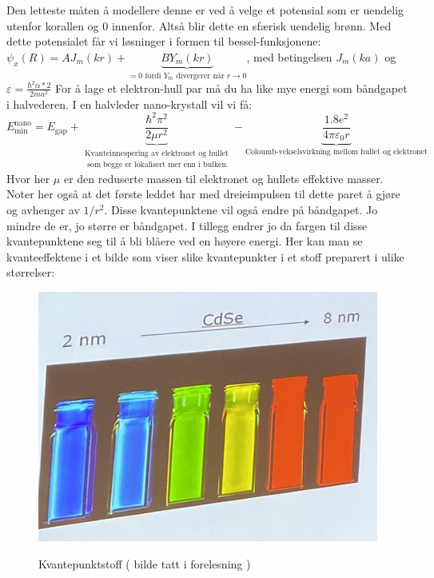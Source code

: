 \documentclass{article}
\begin{document}
Den letteste måten å modellere denne er ved å velge et potensial som er uendelig utenfor korallen og 0 innenfor. Altså blir dette en sfærisk uendelig brønn. Med dette potensialet får vi løsninger i formen til bessel-funksjonene: $\psi_x(R) = AJ_m(kr) + \underbrace{BY_m(kr)}_{=0 \text{ fordi $Y_m$ divergerer når $r\rightarrow 0$}}$, med betingelsen $J_m(ka)$ og $\varepsilon = \frac{\hbar^2 \alpha*2}{2ma^2}$   
For å lage et elektron-hull par må du ha like mye energi som båndgapet i halvederen. I en halvleder nano-krystall vil vi få:
\begin{equation}
  E^{\text{nano}}_{\text{min}} = E_{\text{gap}} + \underbrace{ \frac{\hbar^2 \pi^2}{2 \mu r^2}}_{\substack{\text{Kvanteinnespering av elektronet og hullet} \\ \text{ som begge er lokalisert mer enn i bulken.}}} - \underbrace{\frac{1.8 e^2}{4 \pi \varepsilon_0 r}}_{\text{Coloumb-vekselsvirkning mellom hullet og elektronet}}
\end{equation}
Hvor her $\mu$ er den reduserte massen til elektronet og hullets effektive masser. Noter her også at det første leddet har med dreieimpulsen til dette paret å gjøre og avhenger av $1/r^2$. Disse kvantepunktene vil også endre på båndgapet. Jo mindre de er, jo større er båndgapet. I tillegg endrer jo da fargen til disse kvantepunktene seg til å bli blåere ved en høyere energi. Her kan man se kvanteeffektene i et bilde som viser slike kvantepunkter i et stoff preparert i ulike størrelser:
\begin{figure}[h]
  \centering
  \caption{Kvantepunktstoff ( bilde tatt i forelesning )}
  \includegraphics[scale=0.3]{bilder/kvantepunktstoff.jpg}
  \label{fig:kvantepunktstoff}
\end{figure}


\nyside
\printbibliography
\end{document}
